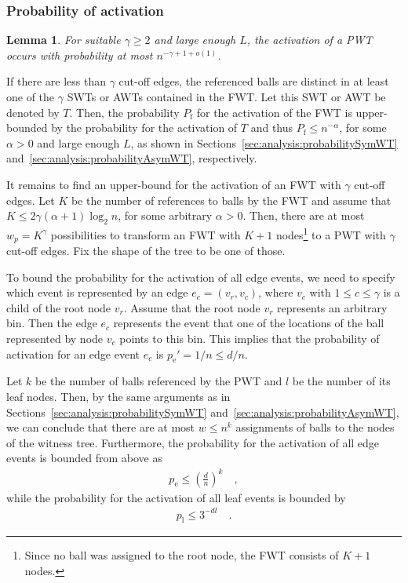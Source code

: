 \documentclass[a4paper,12pt]{article}
\newtheorem{lemma}{Lemma}
\begin{document}
\subsubsection{Probability of activation}
\label{sec:analysis:probabilityFullWT}
\begin{lemma}\label{lemma:fwt:activation}
For suitable $\gamma \geq 2$ and large enough $L$, the activation of a PWT occurs with probability at most $n^{-\gamma +1 +o(1)}$.
\end{lemma}
If there are less than $\gamma$ cut-off edges, the referenced balls are distinct in at least one of the $\gamma$ SWTs or AWTs contained in the FWT. Let this SWT or AWT be denoted by $T$. Then, the probability $P_\mathrm{f}$ for the activation of the FWT is upper-bounded by the probability for the activation of $T$ and thus $P_\mathrm{f} \leq n^{- \alpha}$, for some $\alpha >0$ and large enough $L$, as shown in Sections~\ref{sec:analysis:probabilitySymWT} and~\ref{sec:analysis:probabilityAsymWT}, respectively.

It remains to find an upper-bound for the activation of an FWT with $\gamma$ cut-off edges. Let $K$ be the number of references to balls by the FWT and assume that $K  \leq 2 \gamma\left(\alpha+1\right) \log_2 n$, for some arbitrary $\alpha > 0$. Then, there are at most $w_p=K^\gamma$ possibilities to transform an FWT with $K+1$ nodes\footnote{Since no ball was assigned to the root node, the FWT consists of $K+1$ nodes.} to a PWT with $\gamma$ cut-off edges. Fix the shape of the tree to be one of those. 

To bound the probability for the activation of all edge events, we need to specify which event is represented by an edge $e_c = (v_r, v_c)$, where $v_c$ with $1 \leq c \leq \gamma$ is a child of the root node $v_r$. Assume that the root node $v_r$ represents an arbitrary bin. Then the edge $e_c$ represents the event that one of the locations of the ball represented by node $v_c$ points to this bin. This implies that the probability of activation for an edge event $e_c$ is $p_\mathrm{e}' = 1/n \leq d/n$. 

Let $k$ be the number of balls referenced by the PWT and $l$ be the number of its leaf nodes. Then, by the same arguments as in Sections~\ref{sec:analysis:probabilitySymWT} and~\ref{sec:analysis:probabilityAsymWT}, we can conclude that there are at most $w\leq n^k$ assignments of balls to the nodes of the witness tree. Furthermore, the probability for the activation of all edge events is bounded from above as
\begin{align*}
p_\mathrm{e} \leq  \left(\frac{d}{n}\right)^{k}\quad ,
\end{align*}
while the probability for the activation of all leaf events is bounded by 
\begin{align*}
p_\mathrm{l} \leq 3^{-d l}\quad .
\end{align*} 
\end{document}
